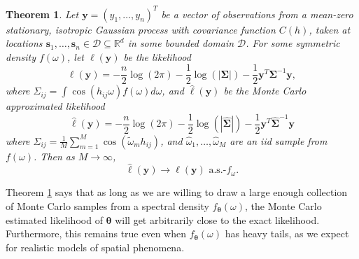 \documentclass[12pt]{article}
\newtheorem{theorem}{Theorem}
\begin{document}
\begin{theorem}
  \label{thm:conssitency}
  Let $\bm{y} = (y_1, \dots, y_n)^T$ be a vector of observations from a mean-zero stationary, isotropic Gaussian process with covariance function $C(h)$, taken at locations $\bm{s}_1, \dots, \bm{s}_n \in \mathcal{D} \subseteq \mathbb{R}^d$ in some bounded domain $\mathcal{D}$.  For some symmetric density $f(\omega)$, let $\ell(\bm{y})$ be the likelihood
  \[
    \ell(\bm{y}) = -\frac{n}{2} \log(2\pi) - \frac{1}{2} \log(|\bm{\Sigma}|) - \frac{1}{2} \bm{y}^T \bm{\Sigma}^{-1} \bm{y},
  \]
where $\Sigma_{ij} = \int \cos(h_{ij}\omega)f(\omega)d\omega$, and $\hat{\ell}(\bm{y})$ be the Monte Carlo approximated likelihood
    \[
    \hat{\ell}(\bm{y}) = -\frac{n}{2} \log(2\pi) - \frac{1}{2} \log (| \widehat{\bm{\Sigma}}|) - \frac{1}{2} \bm{y}^T \widehat{\bm{\Sigma}}^{-1} \bm{y}
  \] 
where $\widehat{\Sigma}_{ij} = \frac{1}{M} \sum_{m=1}^M \cos(\widetilde{\omega}_m h_{ij})$, and $\widehat{\omega}_1, \dots, \widehat{\omega}_M$ are an iid sample from $f(\omega)$.  Then as $M \to \infty$,
\[
\hat{\ell}(\bm{y}) \to \ell(\bm{y}) \text{ a.s.-}f_\omega.
\]

    
\end{theorem}

Theorem \ref{thm:conssitency} says that as long as we are willing to draw a large enough collection of Monte Carlo samples from a spectral density $f_{\bm{\theta}}(\omega)$, the Monte Carlo estimated likelihood of $\bm{\theta}$ will get arbitrarily close to the exact likelihood.  Furthermore, this remains true even when $f_{\bm{\theta}}(\omega)$ has heavy tails, as we expect for realistic models of spatial phenomena.
\end{document}
